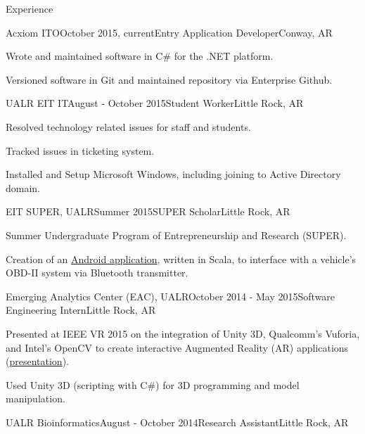\documentclass{resume} %
\begin{document}
\begin{rSection}{Experience}

\begin{rSubsection}{Acxiom ITO}{October 2015, current}{Entry Application Developer}{Conway, AR}

	\item Wrote and maintained software in C\# for the .NET platform.
	\item Versioned software in Git and maintained repository via Enterprise Github.
\end{rSubsection}

\begin{rSubsection}{UALR EIT IT}{August - October 2015}{Student Worker}{Little Rock, AR}

	\item Resolved technology related issues for staff and students.
	\item Tracked issues in ticketing system.
	\item Installed and Setup Microsoft Windows, including joining to Active Directory domain.
\end{rSubsection}

\begin{rSubsection}{EIT SUPER, UALR}{Summer 2015}{SUPER Scholar}{Little Rock, AR}
	\item Summer Undergraduate Program of Entrepreneurship and Research (SUPER).
	\item Creation of an \href{http://github.com/cptaffe/flamethrower}{Android application}, written in Scala, to interface with a vehicle's OBD-II system via Bluetooth transmitter.
\end{rSubsection}

\begin{rSubsection}{Emerging Analytics Center (EAC), UALR}{October 2014 - May 2015}{Software Engineering Intern}{Little Rock, AR}
	\item Presented at IEEE VR 2015 on the integration of Unity 3D, Qualcomm's Vuforia, and Intel's OpenCV to create interactive Augmented Reality (AR) applications (\href{http://byteflame.org/ieee_vr/}{presentation}{}).
	\item Used Unity 3D (scripting with C\#) for 3D programming and model manipulation.
\end{rSubsection}

\begin{rSubsection}{UALR Bioinformatics}{August - October 2014}{Research Assistant}{Little Rock, AR}


\end{rSubsection}
\end{rSection}
\end{document}
